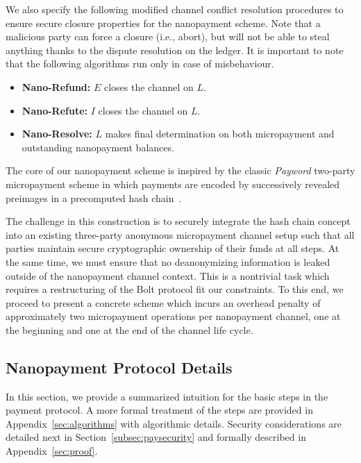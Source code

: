We also specify the following modified channel conflict resolution procedures to ensure secure closure properties for the nanopayment scheme.
Note that a
malicious party can force a closure (i.e., abort), but will not be able to steal anything thanks to the dispute resolution on the ledger.
It is important to note that the following algorithms run only in case of misbehaviour.

\begin{itemize}
\item \textbf{Nano-Refund:} $E$ closes the channel on $L$.
\item \textbf{Nano-Refute:} $I$ closes the channel on $L$.
\item \textbf{Nano-Resolve:} $L$ makes final determination on both micropayment
  and outstanding nanopayment balances.
\end{itemize}

The core of our nanopayment scheme is inspired by the classic \emph{Payword} two-party micropayment scheme in which payments are encoded by successively revealed preimages in a precomputed hash chain~\cite{rivest1996payword}.

The challenge in this construction is to securely integrate the hash chain concept into an existing three-party anonymous micropayment channel setup such that all parties maintain secure cryptographic ownership of their funds at all steps.
At the same time, we must ensure that no deanonymizing information is leaked outside of the nanopayment channel context.
This is a nontrivial task which requires a restructuring of the Bolt protocol fit our constraints.
To this end, we proceed to present a concrete scheme which incurs an overhead penalty of approximately two micropayment operations per nanopayment channel, one at the beginning and one at the end of the channel life cycle.

\subsection{Nanopayment Protocol Details}

\label{sec:nanopaymentdetails} In this section, we provide a summarized intuition for the basic steps in the payment protocol.
A more formal treatment of the steps are provided in Appendix~\ref{sec:algorithms} with algorithmic details.
Security considerations are detailed next in Section~\ref{subsec:paysecurity} and formally described in Appendix~\ref{sec:proof}.


